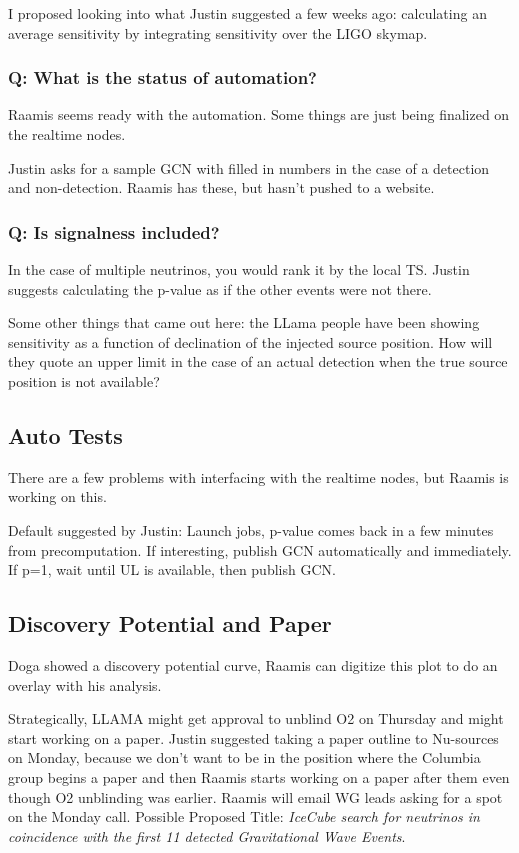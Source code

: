 I proposed looking into what Justin suggested a few weeks ago: calculating an average sensitivity by integrating sensitivity over the LIGO skymap.

\subsubsection{Q: What is the status of automation?}
Raamis seems ready with the automation. Some things are just being finalized on the realtime nodes. 

Justin asks for a sample GCN with filled in numbers in the case of a detection and non-detection. Raamis has these, but hasn't pushed to a website. 

\subsubsection{Q: Is signalness included?}
In the case of multiple neutrinos, you would rank it by the local TS. Justin suggests calculating the p-value as if the other events were not there. 

Some other things that came out here: the LLama people have been showing sensitivity as a function of declination of the injected source position. How will they quote an upper limit in the case of an actual detection when the true source position is not available?

\subsection{\textbf{Auto Tests}}
There are a few problems with interfacing with the realtime nodes, but Raamis is working on this. 

Default suggested by Justin: Launch jobs, p-value comes back in a few minutes from precomputation. If interesting, publish GCN automatically and immediately. If p=1, wait until UL is available, then publish GCN. 

\subsection{\textbf{Discovery Potential and Paper}}
Doga showed a discovery potential curve, Raamis can digitize this plot to do an overlay with his analysis. 

Strategically, LLAMA might get approval to unblind O2 on Thursday and might start working on a paper. Justin suggested taking a paper outline to Nu-sources on Monday, because we don't want to be in the position where the Columbia group begins a paper and then Raamis starts working on a paper after them even though O2 unblinding was earlier.  Raamis will email WG leads asking for a spot on the Monday call. Possible Proposed Title: \emph{IceCube search for neutrinos in coincidence with the first 11 detected Gravitational Wave Events}.

